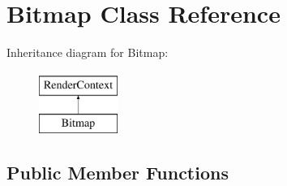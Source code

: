 \hypertarget{class_bitmap}{}\section{Bitmap Class Reference}
\label{class_bitmap}
Inheritance diagram for Bitmap\+:\begin{figure}[H]
\begin{center}
\leavevmode
\includegraphics[height=2.000000cm]{class_bitmap}
\end{center}
\end{figure}
\subsection*{Public Member Functions}
